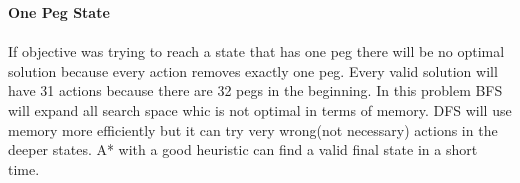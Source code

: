 \documentclass[11pt]{article}
\renewcommand\part[1]{\vspace{.10in}\textbf{#1}}
\begin{document}
	\part{One Peg State} \\ \ \\
	
	If objective was trying to reach a state that has one peg there will be no optimal solution because every action removes exactly one peg. Every valid solution will have 31 actions because there are 32 pegs in the beginning. In this problem BFS will expand all search space whic is not optimal in terms of memory. DFS will use memory more efficiently but it can try very wrong(not necessary) actions in the deeper states. A* with a good heuristic can find a valid final state in a short time.
\end{document}
